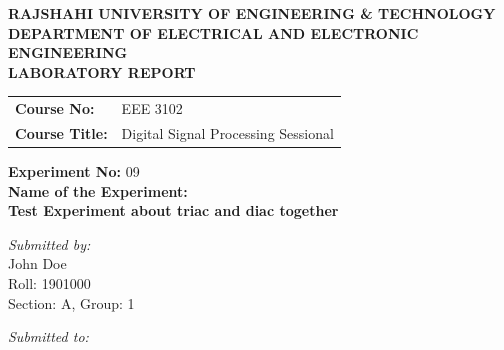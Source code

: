 \documentclass[12pt,a4paper]{article}
\begin{document}
\begin{titlepage}
    \sffamily
    \centering
    \vspace*{1cm}
    
    \Large \textbf{\MakeUppercase{ Rajshahi University of Engineering \& Technology }} \\
    \vspace{0.5cm}
    \large \textbf{\MakeUppercase{ Department of Electrical and Electronic Engineering }} \\
    
    \vspace{2.5cm}
    \Large \textbf{LABORATORY REPORT} \\
    \vspace{1cm}
    
    \begin{tabular}{ll}
        \textbf{Course No:} & EEE 3102 \\
        \textbf{Course Title:} & Digital Signal Processing Sessional \\
    \end{tabular}
    
    \vspace{2cm}
    
    \textbf{Experiment No:} 09 \\
    \vspace{0.5cm}
    \textbf{Name of the Experiment:} \\
    \Large \textbf{ Test Experiment about triac and diac together } \\
    
    \vspace{2.5cm}
    
    \begin{minipage}[t]{0.4\textwidth}
        \begin{flushleft} \large
            \emph{Submitted by:}\\
            John Doe \\
            Roll: 1901000 \\
            Section: A, Group: 1
        \end{flushleft}
    \end{minipage}
    \hfill
    \begin{minipage}[t]{0.5\textwidth}
        \begin{flushright} \large
            \emph{Submitted to:} \\
            

\end{flushright}
\end{minipage}
\end{titlepage}
\end{document}
